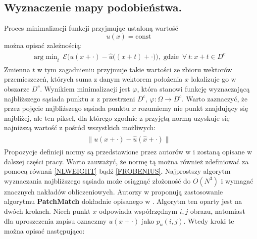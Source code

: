 \documentclass[12pt, twoside, openany]{report}
\theoremstyle{definition}
\begin{document}
\subsection{Wyznaczenie mapy podobieństwa.}
\label{ssec:wyznaczanieMapySection}
Proces minimalizacji funkcji przyjmując ustaloną wartość
\begin{equation}
u(x) = \text{const}
\end{equation}
można opisać zależnością:
\begin{align}
\begin{aligned}
\mathop{\operatorname{arg \ min}}_{t} \ \mathcal{E}\biggl( u(x+\cdot) - {\hat{u}}\bigl((x+t)+\cdot\bigr)\biggr),\operatorname{gdzie} \ \forall \ t : x+t \in D^c
\label{minNNF}
\end{aligned}
\end{align}
Zmienna $t$ w tym zagadnieniu przyjmuje takie wartości ze zbioru wektorów przemieszczeń, których suma z danym wektorem położenia $x$ lokalizuje go w obszarze $D^c$. Wynikiem minimalizacji jest $\varphi$, która stanowi funkcję wyznaczającą najbliższego sąsiada punktu $x$ z przestrzeni $D^c$, $\varphi :\Omega \rightarrow D^c$. Warto zaznaczyć, że przez pojęcie najbliższego sąsiada punktu $x$ rozumiemy nie punkt znajdujący się najbliżej, ale ten piksel, dla którego zgodnie z przyjętą normą uzyskuje się najniższą wartość z pośród wszystkich możliwych:
\begin{align}
\begin{aligned}
\big\| u(x + \cdot) - \hat{u}(\hat{x}+\cdot) \big\| 
\label{normNNF}
\end{aligned}
\end{align}
Propozycje definicji normy są przedstawione przez autorów w \cite{MathematicalModelsforNLTextureInpainting} i zostaną opisane w dalszej części pracy. Warto zauważyć, że normę tą można również zdefiniować za pomocą równań \eqref{NLWEIGHT} bądź \eqref{FROBENIUS}. Najprostszy algorytm wyznaczania najbliższego sąsiada może osiągnąć złożoność do $O(N^3)$ i wymagać znacznych nakładów obliczeniowych. Autorzy w \cite{arias2011variational} proponują zastosowanie algorytmu \textbf{PatchMatch} dokładnie opisanego w \cite{barnes2009patchmatch}. Algorytm ten oparty jest na dwóch krokach. Niech punkt $x$ odpowiada współrzędnym $i, j$ obrazu, natomiast dla uproszczenia zapisu oznaczmy $u(x+\cdot)$ jako $p_u(i,j)$. Wtedy kroki te można opisać następująco:
\end{document}
